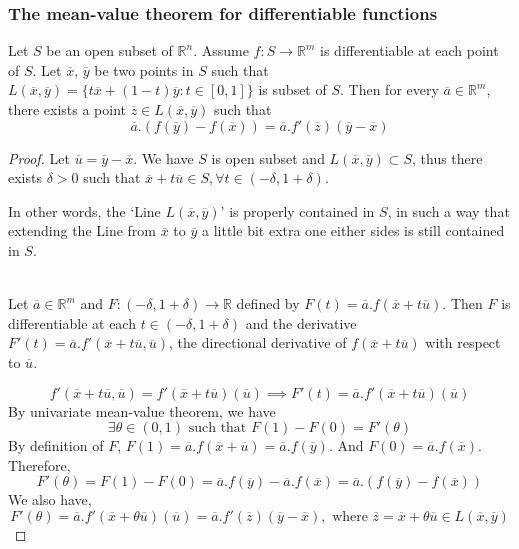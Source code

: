 \subsubsection{The mean-value theorem for differentiable functions}
\begin{theorem}
	Let $S$ be an open subset of $\mathbb{R}^n$. Assume $f : S \to \mathbb{R}^m$ is differentiable at each point of $S$. Let $\overline{x}$, $\overline{y}$ be two points in $S$ such that $L(\overline{x},\overline{y}) = \{ t\overline{x}+(1-t)\overline{y} : t \in [0,1] \}$ is subset of $S$. Then for every $\overline{a} \in \mathbb{R}^m$, there exists a point $\overline{z} \in L(\overline{x},\overline{y})$ such that
	\[ \overline{a}.\left( f(\overline{y})-f(\overline{x}) \right) = \overline{a}.f'(\overline{z})(\overline{y}-\overline{x}) \]
\end{theorem}
\begin{proof}
	Let $\overline{u} = \overline{y}-\overline{x}$. We have $S$ is open subset and $L(\overline{x},\overline{y}) \subset S$, thus there exists $\delta > 0$ such that $\overline{x}+t\overline{u} \in S, \forall t \in (-\delta,1+\delta)$.\begin{commentary} In other words, the `Line $L(\overline{x},\overline{y})$' is properly contained in $S$, in such a way that extending the Line from $\overline{x}$ to $\overline{y}$ a little bit extra one either sides is still contained in $S$.\end{commentary}\\

	Let $\overline{a} \in \mathbb{R}^m$ and $F : (-\delta,1+\delta) \to \mathbb{R}$ defined by $F(t) = \overline{a}.f(\overline{x}+t\overline{u})$.  Then $F$ is differentiable at each $t \in (-\delta,1+\delta)$ and the derivative $F'(t) = \overline{a}.f'(\overline{x}+t\overline{u},\overline{u})$, the directional derivative of $f(\overline{x}+t\overline{u})$ with respect to $\overline{u}$.

	\[ f'(\overline{x}+t\overline{u},\overline{u}) = f'(\overline{x}+t\overline{u})(\overline{u}) \implies F'(t) = \overline{a}.f'(\overline{x}+t\overline{u})(\overline{u}) \]
	By univariate mean-value theorem, we have
	\[ \exists \theta \in (0,1) \text{ such that } F(1) - F(0) = F'(\theta) \]
	By definition of $F$, $F(1) = \overline{a}.f(\overline{x}+\overline{u}) = \overline{a}.f(\overline{y})$. And $F(0) =\overline{a}.f(\overline{x})$. Therefore,
	\[ F'(\theta) = F(1) - F(0) = \overline{a}.f(\overline{y}) - \overline{a}.f(\overline{x}) = \overline{a}.(f(\overline{y})-f(\overline{x})) \]
	We also have,
	\[ F'(\theta) = \overline{a}.f'(\overline{x}+\theta \overline{u})(\overline{u}) = \overline{a}.f'(\overline{z})(\overline{y}-\overline{x}), \text{ where } \overline{z} = \overline{x}+\theta \overline{u} \in L(\overline{x},\overline{y}) \]
\end{proof}

